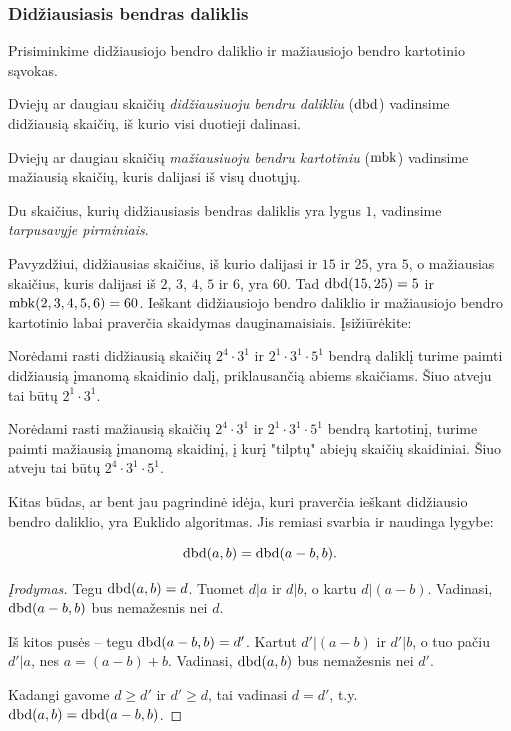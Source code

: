 \subsubsection{Didžiausiasis bendras daliklis}

Prisiminkime didžiausiojo bendro daliklio ir mažiausiojo bendro kartotinio
sąvokas.

\begin{api}Dviejų ar daugiau skaičių \emph{didžiausiuoju bendru dalikliu} ($\operatorname{dbd}$)
  vadinsime didžiausią skaičių, iš kurio visi duotieji dalinasi.  
\end{api}

\begin{api} Dviejų ar daugiau skaičių \emph{mažiausiuoju bendru kartotiniu} ($\operatorname{mbk}$)
  vadinsime mažiausią skaičių, kuris dalijasi iš visų duotųjų.  
\end{api}

\begin{api}
  Du skaičius, kurių didžiausiasis bendras daliklis yra lygus $1$, vadinsime
  \emph{tarpusavyje pirminiais}.
\end{api}

Pavyzdžiui, didžiausias skaičius, iš kurio dalijasi ir $15$ ir $25$, yra $5$,
o mažiausias skaičius, kuris dalijasi iš $2$, $3$, $4$, $5$ ir $6$, yra
$60$. Tad $\operatorname{dbd}(15,25)=5$ ir $\operatorname{mbk}(2,3,4,5,6)=60$. Ieškant didžiausiojo
bendro daliklio ir mažiausiojo bendro kartotinio labai praverčia skaidymas
dauginamaisiais. Įsižiūrėkite:

Norėdami rasti didžiausią skaičių $2^4\cdot3^1$ ir $2^1\cdot3^1\cdot5^1$
bendrą daliklį turime paimti didžiausią įmanomą skaidinio dalį,
priklausančią abiems skaičiams. Šiuo atveju tai būtų $2^1\cdot3^1$.

Norėdami rasti mažiausią skaičių $2^4\cdot3^1$ ir $2^1\cdot3^1\cdot5^1$
bendrą kartotinį, turime paimti mažiausią įmanomą skaidinį, į kurį "tilptų"
abiejų skaičių skaidiniai. Šiuo atveju tai būtų $2^4 \cdot 3^1 \cdot 5^1$.

Kitas būdas, ar bent jau pagrindinė idėja, kuri praverčia ieškant
didžiausio bendro daliklio, yra Euklido algoritmas. Jis remiasi svarbia ir
naudinga lygybe:
\begin{teig}
  $$\operatorname{dbd}(a,b) = \operatorname{dbd}(a-b,b).$$
\end{teig}

\begin{proof}[Įrodymas]
Tegu $\operatorname{dbd}(a,b)=d$. Tuomet $d|a$ ir $d|b$, o kartu $d|(a-b)$. Vadinasi,
$\operatorname{dbd}(a-b,b)$ bus nemažesnis nei $d$.  

Iš kitos pusės -- tegu $\operatorname{dbd}(a-b,b) = d'$. Kartut $d'|(a-b)$ ir $d'|b$, o
tuo pačiu $d'|a$, nes $a = (a-b) + b$.  Vadinasi, $\operatorname{dbd}(a,b)$ bus nemažesnis
nei $d'$. 

Kadangi gavome $d\geq d'$ ir $d' \geq d$, tai vadinasi $d=d'$, t.y.
$\operatorname{dbd}(a,b) = \operatorname{dbd}(a-b,b)$.
\end{proof}

